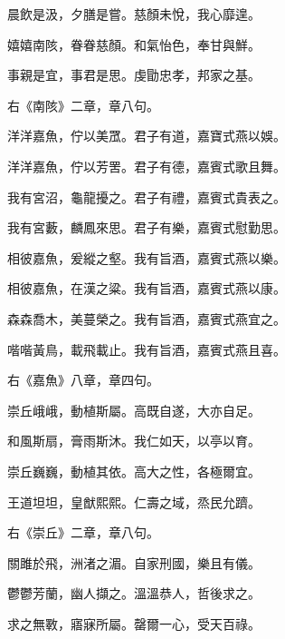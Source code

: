 \begin{pinyinscope}
 晨飲是汲，夕膳是嘗。慈顏未悅，我心靡遑。



 嬉嬉南陔，眷眷慈顏。和氣怡色，奉甘與鮮。



 事親是宜，事君是思。虔勖忠孝，邦家之基。



 右《南陔》二章，章八句。



 洋洋嘉魚，佇以美罛。君子有道，嘉寶式燕以娛。



 洋洋嘉魚，佇以芳罟。君子有德，嘉賓式歌且舞。



 我有宮沼，龜龍擾之。君子有禮，嘉賓式貴表之。



 我有宮藪，麟鳳來思。君子有樂，嘉賓式慰勤思。



 相彼嘉魚，爰縱之壑。我有旨酒，嘉賓式燕以樂。



 相彼嘉魚，在漢之粱。我有旨酒，嘉賓式燕以康。



 森森喬木，美蔓榮之。我有旨酒，嘉賓式燕宜之。



 喈喈黃鳥，載飛載止。我有旨酒，嘉賓式燕且喜。



 右《嘉魚》八章，章四句。



 崇丘峨峨，動植斯屬。高既自遂，大亦自足。



 和風斯扇，膏雨斯沐。我仁如天，以亭以育。



 崇丘巍巍，動植其依。高大之性，各極爾宜。



 王道坦坦，皇猷熙熙。仁壽之域，烝民允躋。



 右《崇丘》二章，章八句。



 關雎於飛，洲渚之湄。自家刑國，樂且有儀。



 鬱鬱芳蘭，幽人擷之。溫溫恭人，哲後求之。



 求之無斁，寤寐所屬。罄爾一心，受天百祿。




\end{pinyinscope}
